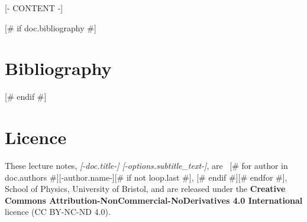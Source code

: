 \documentclass[11pt,oneside,openany]{book}
\theoremstyle{blacknumbox}
\let\qmtextbf\textbf
\renewcommand{\textbf}[1]{\qmtextbf{\textcolor{maincolor}{#1}}}
\begin{document}
\vfill
\endgroup

\pagestyle{fancy}

[- CONTENT -]

[# if doc.bibliography #]
\cleardoublepage
{}
{}
\chapter*{Bibliography}

\renewcommand{\bibsection}{}

[# endif #]

\cleardoublepage
{}
{}
\chapter*{Licence}
\noindent These lecture notes, \emph{[-doc.title-] [-options.subtitle_text-]}, are \textcopyright\ [# for author in doc.authors #][-author.name-][# if not loop.last #], [# endif #][# endfor #], School of Physics, University of Bristol, and are released under the \textbf{Creative Commons Attribution-NonCommercial-NoDerivatives 4.0 International} licence (CC BY-NC-ND 4.0).
\end{document}
